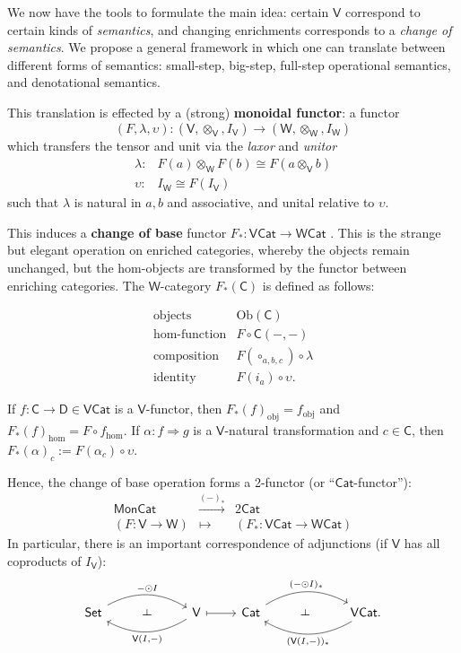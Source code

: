 \documentclass{amsart}
\theoremstyle{definition}
\def\ld{\rotatebox[origin=c]{-90}{$\dashv$}} %
\newcommand{\Set}{\mathsf{Set}}
\newcommand{\Cat}{\mathsf{Cat}}
\newcommand{\Mon}{\mathsf{Mon}}
\newcommand{\V}{\mathsf{V}}
\newcommand{\W}{\mathsf{W}}
\newcommand{\D}{\mathsf{D}}
\newcommand{\C}{\mathsf{C}}
\newcommand{\Obj}{\mathrm{Ob}}
\newcommand{\maps}{\colon}
\begin{document}
We now have the tools to formulate the main idea: certain $\V$ correspond to certain kinds of \textit{semantics}, and changing enrichments corresponds to a \textit{change of semantics}. We propose a general framework in which one can translate between different forms of semantics: small-step, big-step, full-step operational semantics, and denotational semantics.

This translation is effected by a (strong) \textbf{monoidal functor}: a functor $$(F,\lambda,\upsilon)\maps (\V,\otimes_\V,I_\V) \to (\W,\otimes_\W,I_\W)$$ which transfers the tensor and unit via the \textit{laxor} and \textit{unitor}
\[\begin{array}{rl}
\lambda\maps & F(a) \otimes_\W F(b) \cong F(a\otimes_\V b)\\
\upsilon\maps & I_\W \cong F(I_\V)
\end{array}\]
such that $\lambda$ is natural in $a,b$ and associative, and unital relative to $\upsilon$.

This induces a \textbf{change of base} functor $F_*\maps\V\Cat \to \W\Cat$ \cite{borceux}. This is the strange but elegant operation on enriched categories, whereby the objects remain unchanged, but the hom-objects are transformed by the functor between enriching categories. The $\W$-category $F_*(\C)$ is defined as follows:

\[\begin{array}{rl}
\text{objects} & \Obj(\C)\\
\text{hom-function} & F \circ \C(-,-)\\
\text{composition} & F(\circ_{a,b,c}) \circ \lambda\\
\text{identity} & F(i_a) \circ \upsilon.
\end{array}\]

If $f\maps \C \to \D \in \V\Cat$ is a $\V$-functor, then $F_*(f)_{\text{obj}} = f_{\text{obj}}$ and $F_*(f)_{\text{hom}} = F\circ f_{\text{hom}}$. If $\alpha\maps f \Rightarrow g$ is a $\V$-natural transformation and $c\in \C$, then $F_*(\alpha)_c := F(\alpha_c) \circ \upsilon$.

Hence, the change of base operation forms a 2-functor (or ``$\Cat$-functor''):
\[\begin{array}{ccc}
\Mon\Cat & \xrightarrow{(-)_*} & 2\Cat\\
(F\maps \V\to\W) & \mapsto & (F_*\maps \V\Cat\to\W\Cat)
\end{array}\]
In particular, there is an important correspondence of adjunctions (if $\V$ has all coproducts of $I_\V$):
\[\begin{tikzcd}
	\Set \arrow[bend left,below]{rr}{-\odot I}
	& \ld &
	\arrow[bend left,above]{ll}{\V(I,-)} \V
	\arrow[maps to]{r}
	& \Cat \arrow[bend left,below]{rr}{(-\odot I)_*}
	& \ld &
	\arrow[bend left,above]{ll}{(\V(I,-))_*} \V\Cat.
\end{tikzcd}\]
\end{document}
